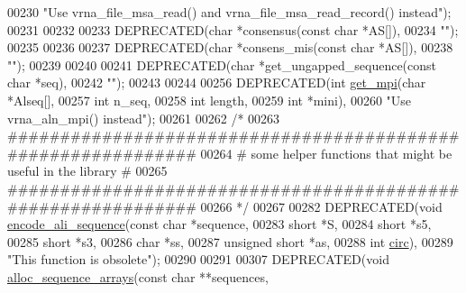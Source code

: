 \begin{DoxyCode}
00230           \textcolor{stringliteral}{"Use vrna\_file\_msa\_read() and vrna\_file\_msa\_read\_record() instead"});
00231 
00232 
00233 DEPRECATED(\textcolor{keywordtype}{char} *consensus(\textcolor{keyword}{const} \textcolor{keywordtype}{char} *AS[]),
00234           \textcolor{stringliteral}{""});
00235 
00236 
00237 DEPRECATED(\textcolor{keywordtype}{char} *consens\_mis(\textcolor{keyword}{const} \textcolor{keywordtype}{char} *AS[]),
00238           \textcolor{stringliteral}{""});
00239 
00240 
00241 DEPRECATED(\textcolor{keywordtype}{char} *get\_ungapped\_sequence(\textcolor{keyword}{const} \textcolor{keywordtype}{char} *seq),
00242           \textcolor{stringliteral}{""});
00243 
00244 
00256 DEPRECATED(\textcolor{keywordtype}{int} \hyperlink{group__aln__utils_gaa2d600be90844094ec145ea14a314d2f}{get\_mpi}(\textcolor{keywordtype}{char} *Alseq[],
00257                        \textcolor{keywordtype}{int}  n\_seq,
00258                        \textcolor{keywordtype}{int}  length,
00259                        \textcolor{keywordtype}{int}  *mini),
00260           \textcolor{stringliteral}{"Use vrna\_aln\_mpi() instead"});
00261 
00262 \textcolor{comment}{/*}
00263 \textcolor{comment}{ #############################################################}
00264 \textcolor{comment}{ # some helper functions that might be useful in the library #}
00265 \textcolor{comment}{ #############################################################}
00266 \textcolor{comment}{ */}
00267 
00282 DEPRECATED(\textcolor{keywordtype}{void} \hyperlink{group__aln__utils_gaa3e40277c837d6f7603afe319884c786}{encode\_ali\_sequence}(\textcolor{keyword}{const} \textcolor{keywordtype}{char}      *sequence,
00283                                     \textcolor{keywordtype}{short}           *S,
00284                                     \textcolor{keywordtype}{short}           *s5,
00285                                     \textcolor{keywordtype}{short}           *s3,
00286                                     \textcolor{keywordtype}{char}            *ss,
00287                                     \textcolor{keywordtype}{unsigned} \textcolor{keywordtype}{short}  *as,
00288                                     \textcolor{keywordtype}{int}             \hyperlink{group__model__details_gaf9202a1a09f5828dc731e2d9a10fa111}{circ}),
00289           \textcolor{stringliteral}{"This function is obsolete"});
00290 
00291 
00307 DEPRECATED(\textcolor{keywordtype}{void}  \hyperlink{group__aln__utils_ga8a560930f7f2582cc3967723a86cfdfa}{alloc\_sequence\_arrays}(\textcolor{keyword}{const} \textcolor{keywordtype}{char}     **sequences,

\end{DoxyCode}
